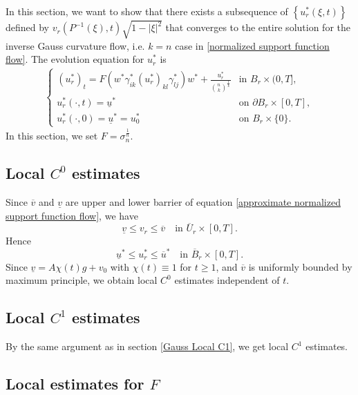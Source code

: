 \documentclass[reqno]{amsart}
\theoremstyle{remark}
\theoremstyle{definition}
\numberwithin{equation}{section}
\begin{document}
In this section, we want to show that there exists a subsequence of  $\left\{ u_r^*(\xi, t)\right\}$ defined by $v_r(P^{-1}(\xi), t)\sqrt{1-|\xi|^2}$ that converges to the entire solution for the inverse Gauss curvature flow, i.e. $k=n$ case in \eqref{normalized support function flow}. 
The evolution equation for $u^*_{r}$ is 
\begin{align}
    \begin{cases}
    (u^*_r)_t = F(w^* \gamma_{ik}^* (u^*_r)_{kl} \gamma_{lj}^*)w^* + \frac{u^*_r}{\binom{n}{k}^{\frac{1}{k}}} & \text{in } B_r \times (0, T], \\[4pt]
    u^*_r(\cdot, t) = \underline{u}^* & \text{on } \partial B_r \times [0, T], \\[4pt]
    u^*_r(\cdot, 0) = \underline{u}^* = u^*_0 & \text{on } B_r \times \{0\}. 
    \end{cases}
    \label{normalized support function flow in B1 model: inverse Gauss curvature}
\end{align}
In this section, we set $F=\sigma_n^{\frac{1}{n}}$.


\subsection{Local \texorpdfstring{$C^0$}{C0} estimates}

Since $\overline{v}$ and $\underline{v}$ are upper and lower barrier of equation \eqref{approximate normalized support function flow}, we have
\[
\underline{v} \leqslant v_{r} \leqslant \overline{v} \quad \text{in } \overline{U}_r \times [0, T].
\]
Hence
\[
\underline{u}^* \leqslant u^*_{r} \leqslant \overline{u}^* \quad \text{in } \overline{B}_r \times [0, T].
\]
Since $\underline{v} = A\chi(t)g + v_0$ with $\chi(t) \equiv 1$ for $t \geqslant 1$, and $\overline{v}$ is uniformly bounded by maximum principle, we obtain local $C^0$ estimates independent of $t$.


\subsection{Local \texorpdfstring{$C^1$}{C1} estimates}

By the same argument as in section \ref{Gauss Local C1}, we get local $C^1$ estimates.


\subsection{Local estimates for \texorpdfstring{$F$}{F}}
\end{document}
